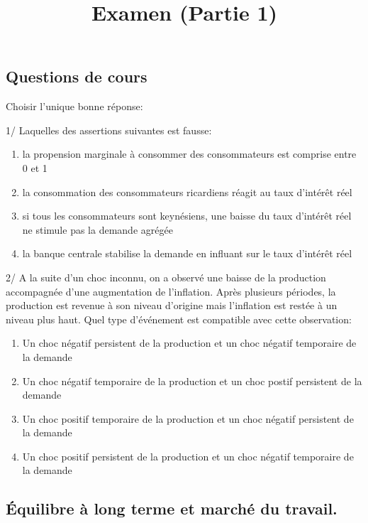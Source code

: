 \documentclass[
  letterpaper,
  DIV=11,
  numbers=noendperiod]{scrartcl}
\title{Examen (Partie 1)}
\author{}
\date{}
\providecommand{\tightlist}{%
  \setlength{\itemsep}{0pt}\setlength{\parskip}{0pt}}\usepackage{longtable,booktabs,array}
\begin{document}
\maketitle

\subsection{Questions de cours}\label{questions-de-cours}

Choisir l'unique bonne réponse:

1/ Laquelles des assertions suivantes est fausse:

\begin{enumerate}
\def\labelenumi{\alph{enumi}.}
\tightlist
\item
  la propension marginale à consommer des consommateurs est comprise
  entre 0 et 1
\item
  la consommation des consommateurs ricardiens réagit au taux d'intérêt
  réel
\item
  si tous les consommateurs sont keynésiens, une baisse du taux
  d'intérêt réel ne stimule pas la demande agrégée
\item
  la banque centrale stabilise la demande en influant sur le taux
  d'intérêt réel
\end{enumerate}

2/ A la suite d'un choc inconnu, on a observé une baisse de la
production accompagnée d'une augmentation de l'inflation. Après
plusieurs périodes, la production est revenue à son niveau d'origine
mais l'inflation est restée à un niveau plus haut. Quel type d'événement
est compatible avec cette observation:

\begin{enumerate}
\def\labelenumi{\alph{enumi}.}
\tightlist
\item
  Un choc négatif persistent de la production et un choc négatif
  temporaire de la demande
\item
  Un choc négatif temporaire de la production et un choc postif
  persistent de la demande
\item
  Un choc positif temporaire de la production et un choc négatif
  persistent de la demande
\item
  Un choc positif persistent de la production et un choc négatif
  temporaire de la demande
\end{enumerate}

\subsection{Équilibre à long terme et marché du
travail.}\label{uxe9quilibre-uxe0-long-terme-et-marchuxe9-du-travail.}
\end{document}
